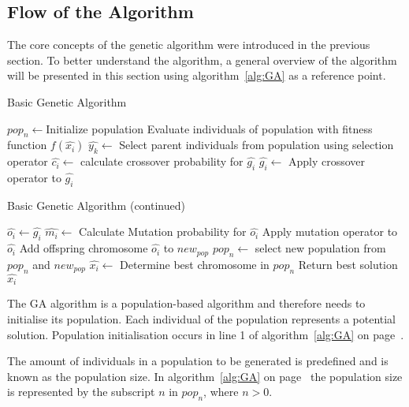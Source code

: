 \subsection{Flow of the Algorithm}
The core concepts of the genetic algorithm were introduced in the previous section. To better understand the algorithm, a general overview of the algorithm will be presented in this section using algorithm~\ref{alg:GA} as a reference point.
\begin{algorithm}[H]
\caption{Basic Genetic Algorithm\cite{GAGoldberg, CompuIntelligenceIntro}}
\label{alg:GA}
	\begin{algorithmic}[1]
		\State $pop_n\leftarrow$Initialize population
    \State Evaluate individuals of population with fitness function $f(\hat{x_i})$
    \State $\hat{y_k} \leftarrow$ Select parent individuals from population using selection operator
		\Repeat
    \State $\hat{c_i} \leftarrow$ calculate crossover probability for $\hat{g_i}$
    \State $\hat{g_i} \leftarrow$ Apply crossover operator to $\hat{g_i}$
    \EndIf
    \end{algorithmic}
\end{algorithm}
\begin{algorithm}[H]
    \caption{Basic Genetic Algorithm (continued)\cite{GAGoldberg, CompuIntelligenceIntro}}
    \begin{algorithmic}
        \State $\hat{o_i} \leftarrow \hat{g_i}$
        \State $\hat{m_i}\leftarrow$ Calculate Mutation probability for $\hat{o_i}$
        \State Apply mutation operator to $\hat{o_i}$
				\EndIf
        \State Add offspring chromosome $\hat{o_i}$ to $new_{pop}$
			\EndFor
		\State $pop_n \leftarrow$ select new population from $pop_n$ and $new_{pop}$
		\EndWhile
    \State $\hat{x_i} \leftarrow$ Determine best chromosome in $pop_n$
    \State Return best solution $\hat{x_i}$
	\end{algorithmic}
\end{algorithm}
The \gls{GA} algorithm is a population-based algorithm and therefore needs to initialise its population. Each individual of the population represents a potential solution. Population initialisation occurs in line 1 of algorithm~\ref{alg:GA} on page~\pageref{alg:GA}. 

The amount of individuals in a population to be generated is predefined and is known as the population size. In algorithm~\ref{alg:GA} on page~\pageref{alg:GA} the population size is represented by the subscript $n$ in $pop_n$, where $n > 0$.

